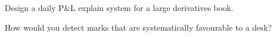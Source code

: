\begin{interviewq}\label{iq:rc:pnl-explain-and-independent-price-verification:5}
Design a daily P\&L explain system for a large derivatives book.
\end{interviewq}

\begin{interviewq}\label{iq:rc:pnl-explain-and-independent-price-verification:6}
How would you detect marks that are systematically favourable to a desk?
\end{interviewq}
